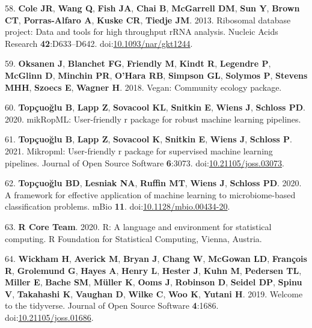 \documentclass[
  11pt,
]{article}
\begin{document}
\leavevmode\hypertarget{ref-Cole2013}{}%
58. \textbf{Cole JR}, \textbf{Wang Q}, \textbf{Fish JA}, \textbf{Chai
B}, \textbf{McGarrell DM}, \textbf{Sun Y}, \textbf{Brown CT},
\textbf{Porras-Alfaro A}, \textbf{Kuske CR}, \textbf{Tiedje JM}. 2013.
Ribosomal database project: Data and tools for high throughput rRNA
analysis. Nucleic Acids Research \textbf{42}:D633--D642.
doi:\href{https://doi.org/10.1093/nar/gkt1244}{10.1093/nar/gkt1244}.

\leavevmode\hypertarget{ref-Vegan2018}{}%
59. \textbf{Oksanen J}, \textbf{Blanchet FG}, \textbf{Friendly M},
\textbf{Kindt R}, \textbf{Legendre P}, \textbf{McGlinn D},
\textbf{Minchin PR}, \textbf{O'Hara RB}, \textbf{Simpson GL},
\textbf{Solymos P}, \textbf{Stevens MHH}, \textbf{Szoecs E},
\textbf{Wagner H}. 2018. Vegan: Community ecology package.

\leavevmode\hypertarget{ref-mikropml}{}%
60. \textbf{Topçuoğlu B}, \textbf{Lapp Z}, \textbf{Sovacool KL},
\textbf{Snitkin E}, \textbf{Wiens J}, \textbf{Schloss PD}. 2020.
mikRopML: User-friendly r package for robust machine learning pipelines.

\leavevmode\hypertarget{ref-Topcuoglu2021}{}%
61. \textbf{Topçuoğlu B}, \textbf{Lapp Z}, \textbf{Sovacool K},
\textbf{Snitkin E}, \textbf{Wiens J}, \textbf{Schloss P}. 2021.
Mikropml: User-friendly r package for supervised machine learning
pipelines. Journal of Open Source Software \textbf{6}:3073.
doi:\href{https://doi.org/10.21105/joss.03073}{10.21105/joss.03073}.

\leavevmode\hypertarget{ref-Topcuoglu2020}{}%
62. \textbf{Topçuoğlu BD}, \textbf{Lesniak NA}, \textbf{Ruffin MT},
\textbf{Wiens J}, \textbf{Schloss PD}. 2020. A framework for effective
application of machine learning to microbiome-based classification
problems. mBio \textbf{11}.
doi:\href{https://doi.org/10.1128/mbio.00434-20}{10.1128/mbio.00434-20}.

\leavevmode\hypertarget{ref-r_citation_2020}{}%
63. \textbf{R Core Team}. 2020. R: A language and environment for
statistical computing. R Foundation for Statistical Computing, Vienna,
Austria.

\leavevmode\hypertarget{ref-Tidyverse2019}{}%
64. \textbf{Wickham H}, \textbf{Averick M}, \textbf{Bryan J},
\textbf{Chang W}, \textbf{McGowan LD}, \textbf{François R},
\textbf{Grolemund G}, \textbf{Hayes A}, \textbf{Henry L}, \textbf{Hester
J}, \textbf{Kuhn M}, \textbf{Pedersen TL}, \textbf{Miller E},
\textbf{Bache SM}, \textbf{Müller K}, \textbf{Ooms J}, \textbf{Robinson
D}, \textbf{Seidel DP}, \textbf{Spinu V}, \textbf{Takahashi K},
\textbf{Vaughan D}, \textbf{Wilke C}, \textbf{Woo K}, \textbf{Yutani H}.
2019. Welcome to the tidyverse. Journal of Open Source Software
\textbf{4}:1686.
doi:\href{https://doi.org/10.21105/joss.01686}{10.21105/joss.01686}.
\end{document}
